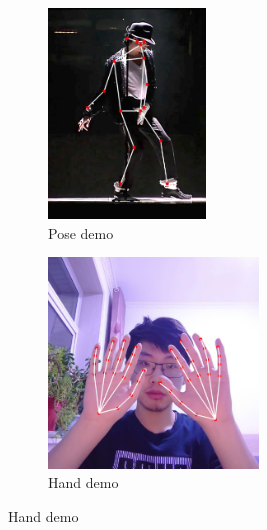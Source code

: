 \begin{figure}[ptb]
    \centering
    \begin{subfigure}{0.4\textwidth}
    \centering
    \includegraphics[height=2.2in]{figure/pose_demo.png}
    \caption{Pose demo}
    \label{subfig:pose_demo}
    \end{subfigure}
    \begin{subfigure}{0.5\textwidth}
    \centering
    \includegraphics[height=2.2in]{figure/hand_demo.png}
    \caption{Hand demo}
    \label{subfig:hand_demo}
    \end{subfigure}
    \label{fig:demos}
\end{figure}


